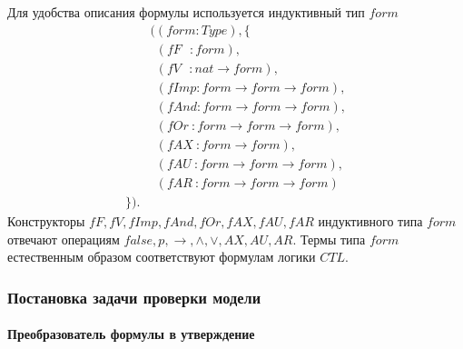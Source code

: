 \documentclass[12pt]{article}
\begin{document}
Для удобства описания формулы используется индуктивный тип $form$
\begin{align*}
& ((form : Type), \{ \\ 
& \ \ (fF\ \ \ : form), \\
& \ \ (fV\ \ \ : nat \xrightarrow{} form), \\
& \ \ (fImp    : form \xrightarrow{} form \xrightarrow{} form), \\
& \ \ (fAnd    : form \xrightarrow{} form \xrightarrow{} form), \\
& \ \ (fOr\    : form \xrightarrow{} form \xrightarrow{} form), \\
& \ \ (fAX\    : form \xrightarrow{} form), \\
& \ \ (fAU\    : form \xrightarrow{} form \xrightarrow{} form), \\
& \ \ (fAR\    : form \xrightarrow{} form \xrightarrow{} form) \\
\}).
\end{align*}
Конструкторы $fF, fV, fImp, fAnd, fOr, fAX, fAU, fAR$ индуктивного типа $form$ отвечают операциям $false, p,\xrightarrow{}, \wedge, \vee, AX, AU, AR $.
Термы типа $form$ естественным образом соответствуют формулам логики $CTL$.

\subsubsection{Постановка задачи проверки модели}
\paragraph{Преобразователь формулы в утверждение}\mbox{}
\end{document}
